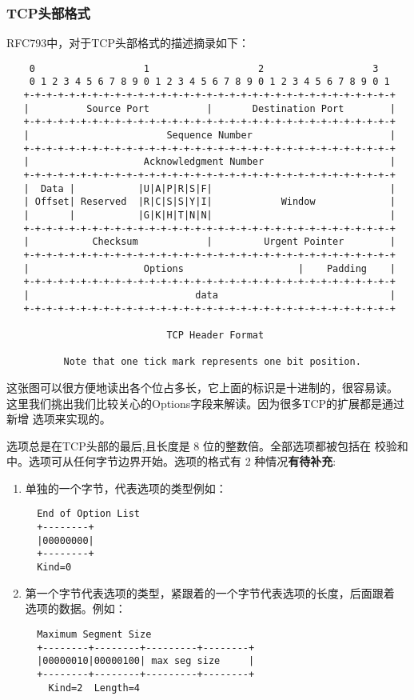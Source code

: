 \subsubsection{TCP头部格式}
\label{subsubsec:tcp_header_format}
RFC793中，对于TCP头部格式的描述摘录如下：
\begin{verbatim}
    0                   1                   2                   3   
    0 1 2 3 4 5 6 7 8 9 0 1 2 3 4 5 6 7 8 9 0 1 2 3 4 5 6 7 8 9 0 1 
   +-+-+-+-+-+-+-+-+-+-+-+-+-+-+-+-+-+-+-+-+-+-+-+-+-+-+-+-+-+-+-+-+
   |          Source Port          |       Destination Port        |
   +-+-+-+-+-+-+-+-+-+-+-+-+-+-+-+-+-+-+-+-+-+-+-+-+-+-+-+-+-+-+-+-+
   |                        Sequence Number                        |
   +-+-+-+-+-+-+-+-+-+-+-+-+-+-+-+-+-+-+-+-+-+-+-+-+-+-+-+-+-+-+-+-+
   |                    Acknowledgment Number                      |
   +-+-+-+-+-+-+-+-+-+-+-+-+-+-+-+-+-+-+-+-+-+-+-+-+-+-+-+-+-+-+-+-+
   |  Data |           |U|A|P|R|S|F|                               |
   | Offset| Reserved  |R|C|S|S|Y|I|            Window             |
   |       |           |G|K|H|T|N|N|                               |
   +-+-+-+-+-+-+-+-+-+-+-+-+-+-+-+-+-+-+-+-+-+-+-+-+-+-+-+-+-+-+-+-+
   |           Checksum            |         Urgent Pointer        |
   +-+-+-+-+-+-+-+-+-+-+-+-+-+-+-+-+-+-+-+-+-+-+-+-+-+-+-+-+-+-+-+-+
   |                    Options                    |    Padding    |
   +-+-+-+-+-+-+-+-+-+-+-+-+-+-+-+-+-+-+-+-+-+-+-+-+-+-+-+-+-+-+-+-+
   |                             data                              |
   +-+-+-+-+-+-+-+-+-+-+-+-+-+-+-+-+-+-+-+-+-+-+-+-+-+-+-+-+-+-+-+-+

                            TCP Header Format

          Note that one tick mark represents one bit position.
\end{verbatim}

这张图可以很方便地读出各个位占多长，它上面的标识是十进制的，很容易读。
这里我们挑出我们比较关心的Options字段来解读。因为很多TCP的扩展都是通过新增
选项来实现的。

    选项总是在TCP头部的最后,且长度是 8 位的整数倍。全部选项都被包括在
校验和中。选项可从任何字节边界开始。选项的格式有 2 种情况\textbf{有待补充}:
\begin{enumerate}
\item 单独的一个字节，代表选项的类型例如：

\begin{verbatim}
  End of Option List
  +--------+
  |00000000| 
  +--------+ 
  Kind=0
\end{verbatim}

\item 第一个字节代表选项的类型，紧跟着的一个字节代表选项的长度，后面跟着
选项的数据。例如：

\begin{verbatim}
  Maximum Segment Size
  +--------+--------+---------+--------+ 
  |00000010|00000100| max seg size     | 
  +--------+--------+---------+--------+ 
    Kind=2  Length=4
\end{verbatim}

\end{enumerate}

